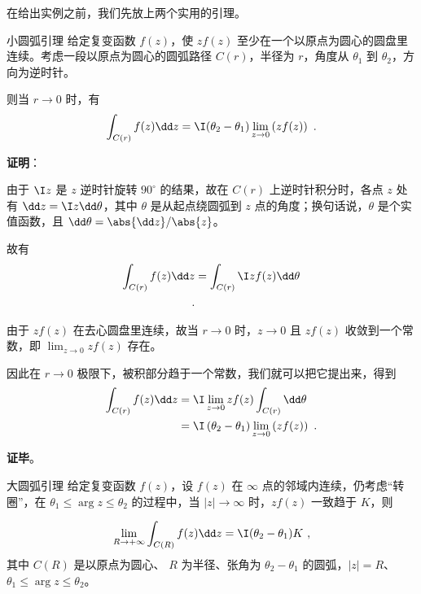 在给出实例之前，我们先放上两个实用的引理。

\begin{lemma}{小圆弧引理}\label{lem_JdLem_1}
给定复变函数 $f(z)$，使 $zf(z)$ 至少在一个以原点为圆心的圆盘里连续。考虑一段以原点为圆心的圆弧路径 $C(r)$，半径为 $r$，角度从 $\theta_1$ 到 $\theta_2$，方向为逆时针。

则当 $r\to 0$ 时，有
\begin{equation}
\int_{C(r)}f(z)\dd z=\I (\theta_2-\theta_1) \lim\limits_{z\to 0}\left(zf(z)\right)~.
\end{equation}

\end{lemma}


\textbf{证明}：

由于 $\I z$ 是 $z$ 逆时针旋转 $90^\circ$ 的结果，故在 $C(r)$ 上逆时针积分时，各点 $z$ 处有 $\dd z=\I z\dd \theta$，其中 $\theta$ 是从起点绕圆弧到 $z$ 点的角度；换句话说，$\theta$ 是个实值函数，且 $\dd \theta=\abs{\dd z}/\abs{z}$。


故有
\begin{equation}
\begin{aligned}
\int_{C(r)}f(z)\dd z&=\int_{C(r)}\I zf(z)\dd \theta\\~.
\end{aligned}
\end{equation}

由于 $zf(z)$ 在去心圆盘里连续，故当 $r\to 0$ 时，$z\to 0$ 且 $zf(z)$ 收敛到一个常数，即 $\lim_{z\to 0}zf(z)$ 存在。

因此在 $r\to 0$ 极限下，被积部分趋于一个常数，我们就可以把它提出来，得到
\begin{equation}
\begin{aligned}
\int_{C(r)}f(z)\dd z&=\I \lim_{z\to 0}zf(z)\int_{C(r)}\dd \theta\\
&=\I \left(\theta_2-\theta_1 \right) \lim_{z\to 0}\left(zf(z)\right)~.
\end{aligned}
\end{equation}

\textbf{证毕}。










\begin{lemma}{大圆弧引理}
给定复变函数 $f(z)$，设 $f(z)$ 在 $\infty$ 点的邻域内连续，仍考虑“转圈”，在 $\theta_1 \le \arg z \le \theta_2$ 的过程中，当 $|z| \rightarrow \infty$ 时，$z f(z)$ 一致趋于 $K$，则

$$\lim_{R \rightarrow +\infty} \int_{C(R)} f(z) \dd z = \I (\theta_2 - \theta_1) K ~,$$
其中 $C(R)$ 是以原点为圆心、 $R$ 为半径、张角为 $\theta_2 - \theta_1$ 的圆弧，$|z| = R$、$\theta_1 \le \arg z \le \theta_2$。
\end{lemma}














